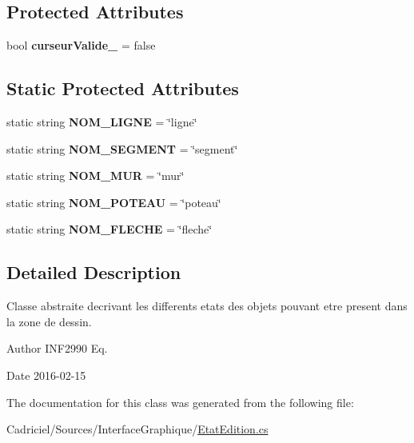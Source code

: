 \subsection*{Protected Attributes}
\begin{DoxyCompactItemize}
\item 
bool {\bfseries curseur\+Valide\+\_\+} = false
\end{DoxyCompactItemize}
\subsection*{Static Protected Attributes}
\begin{DoxyCompactItemize}
\item 
static string {\bfseries N\+O\+M\+\_\+\+L\+I\+G\+NE} = \char`\"{}ligne\char`\"{}
\item 
static string {\bfseries N\+O\+M\+\_\+\+S\+E\+G\+M\+E\+NT} = \char`\"{}segment\char`\"{}
\item 
static string {\bfseries N\+O\+M\+\_\+\+M\+UR} = \char`\"{}mur\char`\"{}
\item 
static string {\bfseries N\+O\+M\+\_\+\+P\+O\+T\+E\+AU} = \char`\"{}poteau\char`\"{}
\item 
static string {\bfseries N\+O\+M\+\_\+\+F\+L\+E\+C\+HE} = \char`\"{}fleche\char`\"{}
\end{DoxyCompactItemize}


\subsection{Detailed Description}
Classe abstraite decrivant les differents etats des objets pouvant etre present dans la zone de dessin. 

\begin{DoxyAuthor}{Author}
I\+N\+F2990 Eq. 
\end{DoxyAuthor}
\begin{DoxyDate}{Date}
2016-\/02-\/15 
\end{DoxyDate}


The documentation for this class was generated from the following file\+:\begin{DoxyCompactItemize}
\item 
Cadriciel/\+Sources/\+Interface\+Graphique/\hyperlink{_etat_edition_8cs}{Etat\+Edition.\+cs}\end{DoxyCompactItemize}
